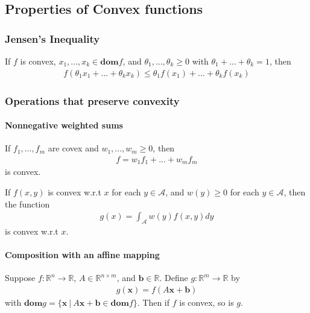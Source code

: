 \subsection{Properties of Convex functions}
\subsubsection{Jensen's Inequality}
\begin{theorem}
    If $f$ is convex, $x_1,..., x_k \in \mathbf{dom}f$,
    and $\theta_1,...,\theta_k \geq 0$ with
    $\theta_1 + ... + \theta_k = 1$, then
    \begin{align}
        f(\theta_1 x_1 + ... + \theta_k x_k)
        \leq \theta_1 f(x_1) + ... + \theta_k f(x_k)
    \end{align}
\end{theorem}

\subsubsection{Operations that preserve convexity}
\paragraph{Nonnegative weighted sums}
If $f_1,..., f_m$ are covex and $w_1,...,w_m \geq 0$,
then
\begin{align}
    f = w_1 f_1 + ... + w_m f_m
\end{align}
is convex.
\par
If $f(x, y)$ is convex w.r.t $x$ for each
$y \in \mathcal{A}$, and $w(y) \geq 0$ for each
$y \in \mathcal{A}$, then the function
\begin{align}
    g(x) = \int_{\mathcal{A}} w(y) f(x, y) dy
\end{align}
is convex w.r.t $x$.

\paragraph{Composition with an affine mapping}
Suppose $f: \mathbb{R}^n \rightarrow \mathbb{R}$,
$A \in \mathbb{R}^{n\times m}$, and $\mathbf{b} \in \mathbb{R}$.
Define $g: \mathbb{R}^m \rightarrow \mathbb{R}$ by
\begin{align}
    g(\mathbf{x}) = f(A \mathbf{x} + \mathbf{b})
\end{align}
with $\mathbf{dom}g = \{ \mathbf{x} \ | \ A\mathbf{x}
+ \mathbf{b} \in \mathbf{dom}f \}$. Then if $f$
is convex, so is $g$.

